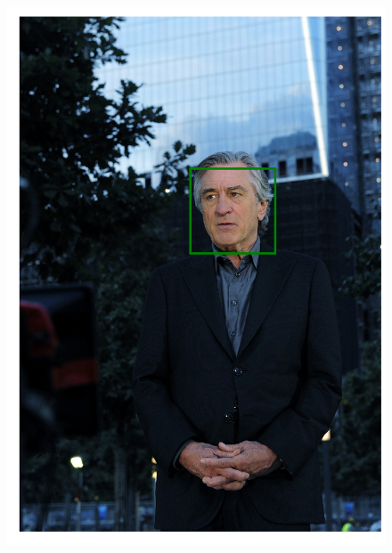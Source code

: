 \begin{figure}[ht]
\begin{minipage}[c]{0.35\linewidth}
          \includegraphics[width=\linewidth]{img/deniro_plt}
     \end{minipage}
\end{figure}

